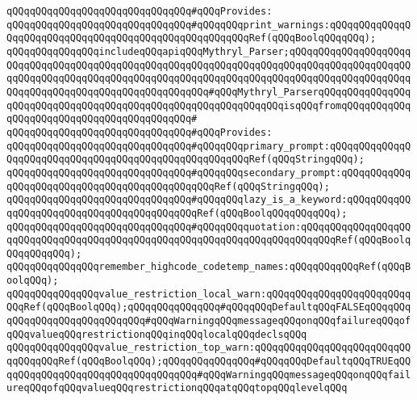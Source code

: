 \verb|qQQqqQQqqQQqqQQqqQQqqQQqqQQqqQQq#qQQqProvides:|\newline
\verb|qQQqqQQqqQQqqQQqqQQqqQQqqQQqqQQq#qQQqqQQqprint_warnings:qQQqqQQqqQQqqQQqqQQqqQQqqQQqqQQqqQQqqQQqqQQqqQQqqQQqqQQqRef(qQQqBoolqQQqqQQq);|\newline
\newline
\verb|qQQqqQQqqQQqqQQqincludeqQQqapiqQQqMythryl_Parser;qQQqqQQqqQQqqQQqqQQqqQQqqQQqqQQqqQQqqQQqqQQqqQQqqQQqqQQqqQQqqQQqqQQqqQQqqQQqqQQqqQQqqQQqqQQqqQQqqQQqqQQqqQQqqQQqqQQqqQQqqQQqqQQqqQQqqQQqqQQqqQQqqQQqqQQqqQQqqQQqqQQqqQQqqQQqqQQqqQQqqQQqqQQqqQQqqQQq#qQQqMythryl_ParserqQQqqQQqqQQqqQQqqQQqqQQqqQQqqQQqqQQqqQQqqQQqqQQqqQQqqQQqqQQqqQQqisqQQqfromqQQqqQQqqQQq|\newline
\verb|qQQqqQQqqQQqqQQqqQQqqQQqqQQqqQQq#|\newline
\verb|qQQqqQQqqQQqqQQqqQQqqQQqqQQqqQQq#qQQqProvides:|\newline
\verb|qQQqqQQqqQQqqQQqqQQqqQQqqQQqqQQq#qQQqqQQqprimary_prompt:qQQqqQQqqQQqqQQqqQQqqQQqqQQqqQQqqQQqqQQqqQQqqQQqqQQqqQQqRef(qQQqStringqQQq);|\newline
\verb|qQQqqQQqqQQqqQQqqQQqqQQqqQQqqQQq#qQQqqQQqsecondary_prompt:qQQqqQQqqQQqqQQqqQQqqQQqqQQqqQQqqQQqqQQqqQQqqQQqRef(qQQqStringqQQq);|\newline
\verb|qQQqqQQqqQQqqQQqqQQqqQQqqQQqqQQq#qQQqqQQqlazy_is_a_keyword:qQQqqQQqqQQqqQQqqQQqqQQqqQQqqQQqqQQqqQQqqQQqRef(qQQqBoolqQQqqQQqqQQq);|\newline
\verb|qQQqqQQqqQQqqQQqqQQqqQQqqQQqqQQq#qQQqqQQqquotation:qQQqqQQqqQQqqQQqqQQqqQQqqQQqqQQqqQQqqQQqqQQqqQQqqQQqqQQqqQQqqQQqqQQqqQQqqQQqRef(qQQqBoolqQQqqQQqqQQq);|\newline
\newline
\newline
\verb|qQQqqQQqqQQqqQQqremember_highcode_codetemp_names:qQQqqQQqqQQqRef(qQQqBoolqQQq);|\newline
\verb|qQQqqQQqqQQqqQQqvalue_restriction_local_warn:qQQqqQQqqQQqqQQqqQQqqQQqqQQqRef(qQQqBoolqQQq);qQQqqQQqqQQqqQQq#qQQqqQQqDefaultqQQqFALSEqQQqqQQqqQQqqQQqqQQqqQQqqQQqqQQq#qQQqWarningqQQqmessageqQQqonqQQqfailureqQQqofqQQqvalueqQQqrestrictionqQQqinqQQqlocalqQQqdeclsqQQq|\newline
\verb|qQQqqQQqqQQqqQQqvalue_restriction_top_warn:qQQqqQQqqQQqqQQqqQQqqQQqqQQqqQQqqQQqRef(qQQqBoolqQQq);qQQqqQQqqQQqqQQq#qQQqqQQqDefaultqQQqTRUEqQQqqQQqqQQqqQQqqQQqqQQqqQQqqQQqqQQq#qQQqWarningqQQqmessageqQQqonqQQqfailureqQQqofqQQqvalueqQQqrestrictionqQQqatqQQqtopqQQqlevelqQQq|\newline
